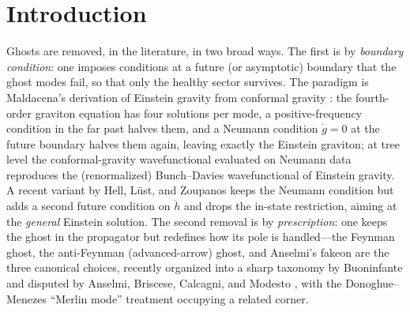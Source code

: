 \documentclass[11pt]{article}
\theoremstyle{definition}
\theoremstyle{remark}
\begin{document}
\newpage
\tableofcontents

\section{Introduction}
\label{sec:intro}

Ghosts are removed, in the literature, in two broad ways. The first
is by \emph{boundary condition}: one imposes conditions at a future
(or asymptotic) boundary that the ghost modes fail, so that only the
healthy sector survives. The paradigm is Maldacena's derivation of
Einstein gravity from conformal gravity \cite{Maldacena2011}: the
fourth-order graviton equation has four solutions per mode, a
positive-frequency condition in the far past halves them, and a
Neumann condition $\dot g=0$ at the future boundary halves them
again, leaving exactly the Einstein graviton; at tree level the
conformal-gravity wavefunctional evaluated on Neumann data reproduces
the (renormalized) Bunch--Davies wavefunctional of Einstein gravity.
A recent variant by Hell, L\"ust, and Zoupanos \cite{HLZ} keeps the
Neumann condition but adds a second future condition on $\ddot h$ and
drops the in-state restriction, aiming at the \emph{general} Einstein
solution. The second removal is by \emph{prescription}: one keeps the
ghost in the propagator but redefines how its pole is handled---the
Feynman ghost, the anti-Feynman (advanced-arrow) ghost, and Anselmi's
fakeon are the three canonical choices, recently organized into a
sharp taxonomy by Buoninfante \cite{BuoninfanteP1,BuoninfanteP2,%
BuoninfanteP3} and disputed by Anselmi, Briscese, Calcagni, and
Modesto \cite{Anselmi2025}, with the Donoghue--Menezes ``Merlin
mode'' treatment \cite{DonoghueMenezes} occupying a related corner.
\end{document}
